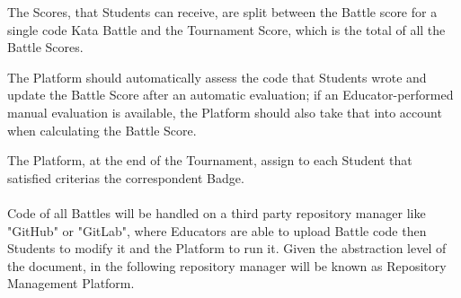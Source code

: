 The Scores, that Students can receive, are split between the Battle score for a single code Kata Battle and the Tournament Score, which is the total of all the Battle Scores.

The Platform should automatically assess the code that Students wrote and update the Battle Score after an automatic evaluation; if an Educator-performed manual evaluation is available, the Platform should also take that into account when calculating the 
Battle Score.

The Platform, at the end of the Tournament, assign to each Student that satisfied criterias the correspondent Badge.\\
\\

Code of all Battles will be handled on a third party repository manager like "GitHub" or "GitLab", where Educators are able to upload Battle code then Students to modify it and the Platform to run it. Given the abstraction level of the document, in the following repository manager will be known as Repository Management Platform.

\newpage

